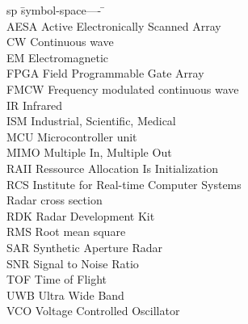 \begin{listofabbrevs}
\begin{tabbing}

sp	\= symbol-space---- \= \kill \+ \\


AESA \> Active Electronically Scanned Array \\
CW \> Continuous wave \\
EM \> Electromagnetic \\
FPGA \> Field Programmable Gate Array \\
FMCW \> Frequency modulated continuous wave \\
IR \> Infrared \\
ISM \> Industrial, Scientific, Medical \\
MCU \> Microcontroller unit \\
MIMO \> Multiple In, Multiple Out \\
RAII \> Ressource Allocation Is Initialization \\
RCS \> Institute for Real-time Computer Systems \\
   	\> Radar cross section \\
RDK \> Radar Development Kit \\
RMS \> Root mean square \\
SAR \> Synthetic Aperture Radar \\
SNR \> Signal to Noise Ratio \\
TOF \> Time of Flight \\
UWB \> Ultra Wide Band \\
VCO \> Voltage Controlled Oscillator \\

\end{tabbing}
\end{listofabbrevs}
